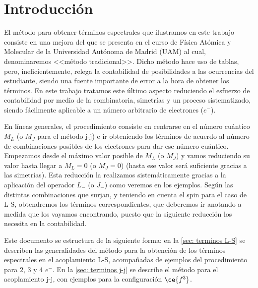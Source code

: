 
\section{Introducción} 
El método para obtener términos espectrales que ilustramos en este trabajo consiste en una mejora del que se presenta en el curso de Física Atómica y Molecular de la Universidad Autónoma de Madrid (UAM) al cual, denominaremos <<método tradicional>>. Dicho método hace uso de tablas, pero, ineficientemente, relega la contabilidad de posibilidades a las ocurrencias del estudiante, siendo una fuente importante de error a la hora de obtener los términos. En este trabajo tratamos este último aspecto reduciendo el esfuerzo de contabilidad por medio de la combinatoria, simetrías y un proceso sistematizado, siendo fácilmente aplicable a un número arbitrario de electrones ($e^{-}$).\par
En líneas generales, el procedimiento consiste en centrarse en el número cuántico $M_{L}$ (o $M_{J}$ para el método j-j) e ir obteniendo los términos de acuerdo al número de combinaciones posibles de los electrones para dar ese número cuántico. Empezamos desde el máximo valor posible de $M_{L}$ (o $M_{J}$) y vamos reduciendo su valor hasta llegar a $M_{L}=0$ (o $M_{J}=0$) (hasta ese valor será suficiente gracias a las simetrías). Esta reducción la realizamos sistemáticamente gracias a la aplicación del operador $L_{-}$ (o $J_{-}$) como veremos en los ejemplos. Según las distintas combinaciones que surjan, y teniendo en cuenta el spin para el caso de L-S, obtendremos los términos correspondientes, que deberemos ir anotando a medida que los vayamos encontrando, puesto que la siguiente reducción los necesita en la contabilidad.\par 
Este documento se estructura de la siguiente forma: en la \autoref{sec: terminos L-S} se describen las generalidades del método para la obtención de los términos espectrales en el acoplamiento L-S, acompañadas de ejemplos del procedimiento para 2, 3 y 4 $e^{-}$. En la \autoref{sec: terminos j-j} se describe el método para el acoplamiento j-j, con ejemplos para la configuración $\ce{f^{3}}$.

